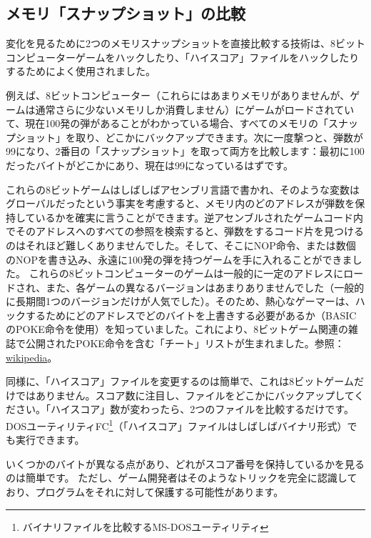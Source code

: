 \subsection{メモリ「スナップショット」の比較}
\label{snapshots_comparing}

変化を見るために2つのメモリスナップショットを直接比較する技術は、8ビットコンピューターゲームをハックしたり、「ハイスコア」ファイルをハックしたりするためによく使用されました。

例えば、8ビットコンピューター（これらにはあまりメモリがありませんが、ゲームは通常さらに少ないメモリしか消費しません）にゲームがロードされていて、現在100発の弾があることがわかっている場合、すべてのメモリの「スナップショット」を取り、どこかにバックアップできます。次に一度撃つと、弾数が99になり、2番目の「スナップショット」を取って両方を比較します：最初に100だったバイトがどこかにあり、現在は99になっているはずです。

これらの8ビットゲームはしばしばアセンブリ言語で書かれ、そのような変数はグローバルだったという事実を考慮すると、メモリ内のどのアドレスが弾数を保持しているかを確実に言うことができます。逆アセンブルされたゲームコード内でそのアドレスへのすべての参照を検索すると、弾数をするコード片を見つけるのはそれほど難しくありませんでした。そして、そこに\gls{NOP}命令、または数個の\gls{NOP}を書き込み、永遠に100発の弾を持つゲームを手に入れることができました。
これらの8ビットコンピューターのゲームは一般的に一定のアドレスにロードされ、また、各ゲームの異なるバージョンはあまりありませんでした（一般的に長期間1つのバージョンだけが人気でした）。そのため、熱心なゲーマーは、ハックするためにどのアドレスでどのバイトを上書きする必要があるか（BASICの\gls{POKE}命令を使用）を知っていました。これにより、8ビットゲーム関連の雑誌で公開された\gls{POKE}命令を含む「チート」リストが生まれました。参照：\href{http://go.yurichev.com/17114}{wikipedia}。


同様に、「ハイスコア」ファイルを変更するのは簡単で、これは8ビットゲームだけではありません。スコア数に注目し、ファイルをどこかにバックアップしてください。「ハイスコア」数が変わったら、2つのファイルを比較するだけです。DOSユーティリティFC\footnote{バイナリファイルを比較するMS-DOSユーティリティ}（「ハイスコア」ファイルはしばしばバイナリ形式）でも実行できます。

いくつかのバイトが異なる点があり、どれがスコア番号を保持しているかを見るのは簡単です。
ただし、ゲーム開発者はそのようなトリックを完全に認識しており、プログラムをそれに対して保護する可能性があります。

